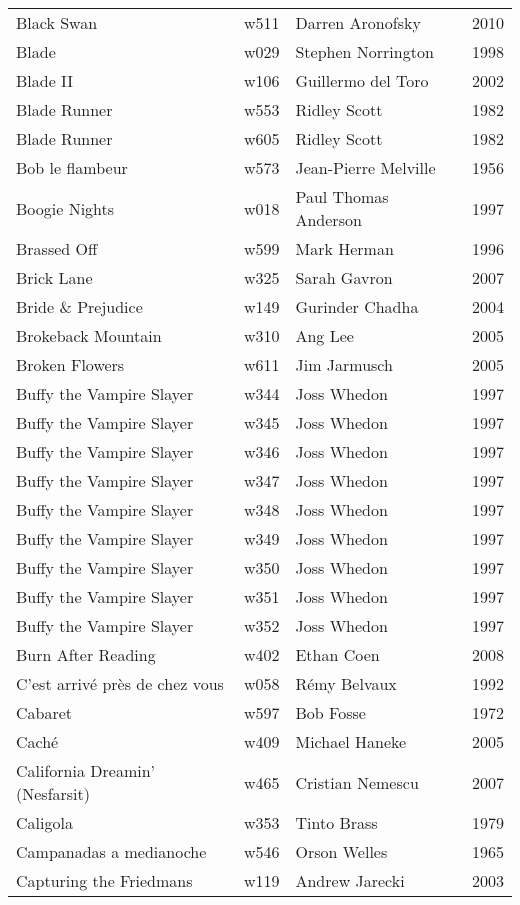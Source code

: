 \documentclass{article}
\begin{document}
\begin {center}
\begin{longtable}{p{10cm} l l l}
Black Swan & w511 & Darren Aronofsky & 2010 \\
Blade & w029 & Stephen Norrington & 1998 \\
Blade II & w106 & Guillermo del Toro & 2002 \\
Blade Runner & w553 & Ridley Scott & 1982 \\
Blade Runner & w605 & Ridley Scott & 1982 \\
Bob le flambeur & w573 & Jean-Pierre Melville & 1956 \\
Boogie Nights & w018 & Paul Thomas Anderson & 1997 \\
Brassed Off & w599 & Mark Herman & 1996 \\
Brick Lane & w325 & Sarah Gavron & 2007 \\
Bride \& Prejudice & w149 & Gurinder Chadha & 2004 \\
Brokeback Mountain & w310 & Ang Lee & 2005 \\
Broken Flowers & w611 & Jim Jarmusch & 2005 \\
Buffy the Vampire Slayer & w344 & Joss Whedon & 1997 \\
Buffy the Vampire Slayer & w345 & Joss Whedon & 1997 \\
Buffy the Vampire Slayer & w346 & Joss Whedon & 1997 \\
Buffy the Vampire Slayer & w347 & Joss Whedon & 1997 \\
Buffy the Vampire Slayer & w348 & Joss Whedon & 1997 \\
Buffy the Vampire Slayer & w349 & Joss Whedon & 1997 \\
Buffy the Vampire Slayer & w350 & Joss Whedon & 1997 \\
Buffy the Vampire Slayer & w351 & Joss Whedon & 1997 \\
Buffy the Vampire Slayer & w352 & Joss Whedon & 1997 \\
Burn After Reading & w402 & Ethan Coen & 2008 \\
C'est arrivé près de chez vous & w058 & Rémy Belvaux & 1992 \\
Cabaret & w597 & Bob Fosse & 1972 \\
Caché & w409 & Michael Haneke & 2005 \\
California Dreamin' (Nesfarsit) & w465 & Cristian Nemescu & 2007 \\
Caligola & w353 & Tinto Brass & 1979 \\
Campanadas a medianoche & w546 & Orson Welles & 1965 \\
Capturing the Friedmans & w119 & Andrew Jarecki & 2003 \\

\end{longtable}
\end{center}
\end{document}
